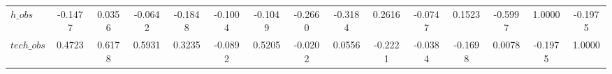 \begin{center}
\begin{longtable}{lcccccccccccccc}
$h\_obs         $	 & 	          -0.1477	 & 	           0.0356	 & 	          -0.0642	 & 	          -0.1848	 & 	          -0.1004	 & 	          -0.1049	 & 	          -0.2660	 & 	          -0.3184	 & 	           0.2616	 & 	          -0.0747	 & 	           0.1523	 & 	          -0.5997	 & 	           1.0000	 & 	          -0.1975 \\ 
$tech\_obs      $	 & 	           0.4723	 & 	           0.6178	 & 	           0.5931	 & 	           0.3235	 & 	          -0.0892	 & 	           0.5205	 & 	          -0.0202	 & 	           0.0556	 & 	          -0.2221	 & 	          -0.0384	 & 	          -0.1698	 & 	           0.0078	 & 	          -0.1975	 & 	           1.0000 \\ 
\end{longtable}
 \end{center}
